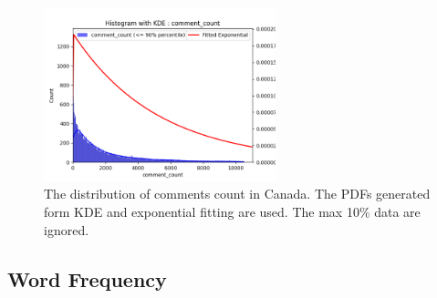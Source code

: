 \documentclass[sigplan,screen]{acmart}
\begin{document}
      \begin{figure}[H]
        \centering
        \includegraphics[width=0.6\textwidth]{figure/CAcomment_countDistrbution.png} 
        \caption{The distribution of comments count in Canada. The PDFs generated form KDE and exponential fitting are used. The max 10\% data are ignored.}
        \label{fig:comments} 
        \end{figure}
\subsection{Word Frequency}
\end{document}
